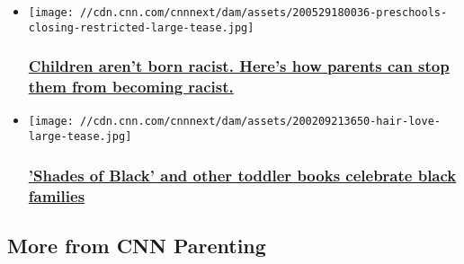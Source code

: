 \begin{itemize}
\item
  \href{/2020/06/06/health/kids-raised-with-bias-wellness/index.html}{}

  \texttt{[image: //cdn.cnn.com/cnnnext/dam/assets/200529180036-preschools-closing-restricted-large-tease.jpg]}

  \hypertarget{children-arent-born-racist-heres-how-parents-can-stop-them-from-becoming-racist}{%
  \subsubsection{\texorpdfstring{\href{/2020/06/06/health/kids-raised-with-bias-wellness/index.html}{Children
  aren't born racist. Here's how parents can stop them from becoming
  racist.}}{Children aren't born racist. Here's how parents can stop them from becoming racist.}}\label{children-arent-born-racist-heres-how-parents-can-stop-them-from-becoming-racist}}
\item
  \href{/2020/06/06/health/diverse-children-books-wellness/index.html}{}

  \texttt{[image: //cdn.cnn.com/cnnnext/dam/assets/200209213650-hair-love-large-tease.jpg]}

  \hypertarget{shades-of-black-and-other-toddler-books-celebrate-black-families}{%
  \subsubsection{\texorpdfstring{\href{/2020/06/06/health/diverse-children-books-wellness/index.html}{'Shades
  of Black' and other toddler books celebrate black
  families}}{'Shades of Black' and other toddler books celebrate black families}}\label{shades-of-black-and-other-toddler-books-celebrate-black-families}}
\end{itemize}

\hypertarget{more-from-cnn-parenting-}{%
\subsection{More from CNN Parenting~}\label{more-from-cnn-parenting-}}

